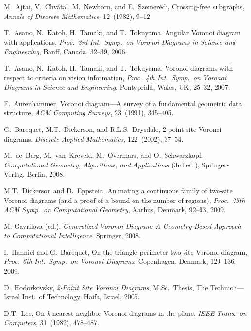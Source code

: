 \documentclass[10pt, conference, compsocconf]{IEEEtran}
\begin{document}
\begin{thebibliography}{99}



{\sc M.~Ajtai, V.~Chv\'{a}tal, M.~Newborn, and E.~Szemer\'{e}di},
Crossing-free subgraphs,
\emph{Annals of Discrete Mathematics},
12~(1982), 9--12.

{\sc T.~Asano, N.~Katoh, H.~Tamaki, and T.~Tokuyama},
Angular Voronoi diagram with applications,
\emph{Proc.\ 3rd Int.\ Symp.\ on Voronoi Diagrams in Science and Engineering},
Banff, Canada, 32--39, 2006.

{\sc T.~Asano, N.~Katoh, H.~Tamaki, and T.~Tokuyama},
Voronoi diagrams with respect to criteria on vision information,
\emph{Proc.\ 4th Int.\ Symp.\ on Voronoi Diagrams in Science and Engineering},
Pontypridd, Wales, UK, 25--32, 2007.

{\sc F.~Aurenhammer},
Voronoi diagram---A survey of a fundamental geometric data structure,
\emph{ACM Computing Surveys},
23~(1991), 345--405.

{\sc G.~Barequet, M.T.~Dickerson, and R.L.S.~Drysdale},
2-point site Voronoi diagrams,
\emph{Discrete Applied Mathematics},
122~(2002), 37--54.

{\sc M.~de~Berg, M.~van~Kreveld, M.~Overmars, and O.~Schwarzkopf},
\emph{Computational Geometry, Algorithms, and Applications} (3rd ed.),
Springer-Verlag, Berlin, 2008.

{\sc M.T.~Dickerson and D.~Eppstein},
Animating a continuous family of two-site Voronoi diagrams (and a proof of
a bound on the number of regions),
\emph{Proc.\ 25th ACM Symp.\ on Computational Geometry},
Aarhus, Denmark, 92--93, 2009.

{\sc M. Gavrilova (ed.)},
\emph{Generalized Voronoi Diagram: A Geometry-Based Approach to
Computational Intelligence}.
Springer, 2008.

{\sc I.~Hanniel and G.~Barequet},
On the triangle-perimeter two-site Voronoi diagram,
{\it Proc.\ 6th Int.\ Symp.\ on Voronoi Diagrams},
Copenhagen, Denmark, 129--136, 2009.

{\sc D.~Hodorkovsky},
\emph{2-Point Site Voronoi Diagrams},
M.Sc.\ Thesis,
The Technion---Israel Inst.\ of Technology,
Haifa, Israel, 2005.

{\sc D.T.~Lee},
On \emph{k}-nearest neighbor Voronoi diagrams in the plane,
\emph{IEEE Trans.\ on Computers},
31~(1982), 478--487.


\end{thebibliography}
\end{document}
